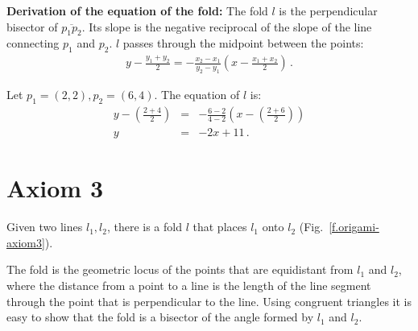 \noindent\textbf{Derivation of the equation of the fold:}
The fold $l$ is the perpendicular bisector of $\overline{p_1p_2}$. Its slope is the negative reciprocal of the slope of the line connecting $p_1$ and $p_2$. $l$ passes through the midpoint between the points:
\begin{align}
y - \frac{y_1+y_2}{2} = -\frac{x_2-x_1}{y_2-y_1}\left(x-\frac{x_1+x_2}{2}\right)\,.\label{eq.midpoint1}
\end{align}

\begin{example}
Let $p_1=(2,2), p_2=(6,4)$. The equation of $l$ is:
\begin{eqnarray*}
y-\left(\frac{2+4}{2}\right)&=&-\frac{6-2}{4-2}\left(x-\left(\frac{2+6}{2}\right)\right)\\
y&=&-2x+11\,.
\end{eqnarray*}
\end{example}



\section{Axiom 3}\label{s.ax3}

\begin{axiom}
Given two lines $l_1,l_2$, there is a fold $l$ that places $l_1$ onto $l_2$ (Fig.~\ref{f.origami-axiom3}).
\end{axiom}

The fold is the geometric locus of the points that are equidistant from $l_1$ and $l_2$, where the distance from a point to a line is the length of the line segment through the point that is perpendicular to the line. Using congruent triangles it is easy to show that the fold is a bisector of the angle formed by $l_1$ and $l_2$.


